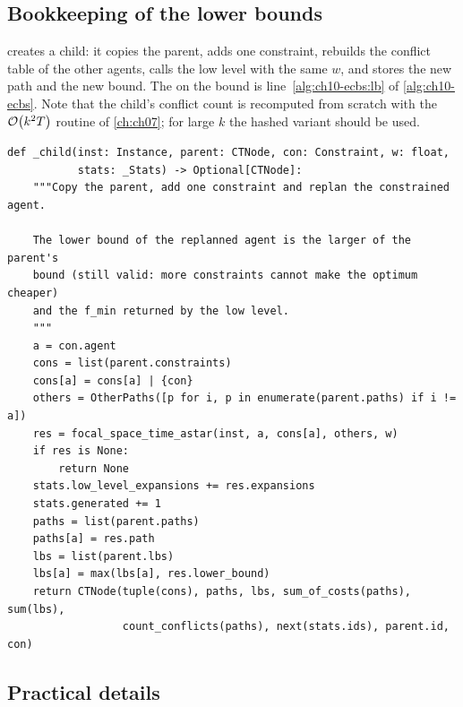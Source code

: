 \subsection{Bookkeeping of the lower bounds}

 creates a child: it copies the parent, adds one
constraint, rebuilds the conflict table of the other agents, calls the low
level with the same $w$, and stores the new path and the new bound. The
 on the bound is line~\ref{alg:ch10-ecbs:lb} of
\cref{alg:ch10-ecbs}. Note that the child's conflict count is recomputed
from scratch with the $\mathcal{O}\!\left(k^2 T\right)$ routine of \cref{ch:ch07}; for large
$k$ the hashed variant should be used.

\begin{lstlisting}[caption={Creating a child node: one more constraint, one replanned agent, and the lower-bound bookkeeping (from \code{code/ch10\_ecbs.py}).},label={lst:ch10-child}]
def _child(inst: Instance, parent: CTNode, con: Constraint, w: float,
           stats: _Stats) -> Optional[CTNode]:
    """Copy the parent, add one constraint and replan the constrained agent.

    The lower bound of the replanned agent is the larger of the parent's
    bound (still valid: more constraints cannot make the optimum cheaper)
    and the f_min returned by the low level.
    """
    a = con.agent
    cons = list(parent.constraints)
    cons[a] = cons[a] | {con}
    others = OtherPaths([p for i, p in enumerate(parent.paths) if i != a])
    res = focal_space_time_astar(inst, a, cons[a], others, w)
    if res is None:
        return None
    stats.low_level_expansions += res.expansions
    stats.generated += 1
    paths = list(parent.paths)
    paths[a] = res.path
    lbs = list(parent.lbs)
    lbs[a] = max(lbs[a], res.lower_bound)
    return CTNode(tuple(cons), paths, lbs, sum_of_costs(paths), sum(lbs),
                  count_conflicts(paths), next(stats.ids), parent.id, con)
\end{lstlisting}

\subsection{Practical details}

